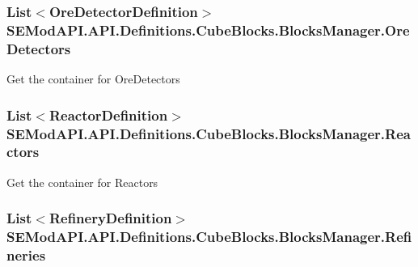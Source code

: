 \subsubsection[{Ore\+Detectors}]{\setlength{\rightskip}{0pt plus 5cm}List$<${\bf Ore\+Detector\+Definition}$>$ S\+E\+Mod\+A\+P\+I.\+A\+P\+I.\+Definitions.\+Cube\+Blocks.\+Blocks\+Manager.\+Ore\+Detectors\hspace{0.3cm}{\ttfamily [get]}}\label{class_s_e_mod_a_p_i_1_1_a_p_i_1_1_definitions_1_1_cube_blocks_1_1_blocks_manager_a89671e3572328f46c8fbfe5e205a9680}


Get the container for Ore\+Detectors 

\hypertarget{class_s_e_mod_a_p_i_1_1_a_p_i_1_1_definitions_1_1_cube_blocks_1_1_blocks_manager_ac682f8c246653d92109ff8ea4dc8aca7}{}
\subsubsection[{Reactors}]{\setlength{\rightskip}{0pt plus 5cm}List$<${\bf Reactor\+Definition}$>$ S\+E\+Mod\+A\+P\+I.\+A\+P\+I.\+Definitions.\+Cube\+Blocks.\+Blocks\+Manager.\+Reactors\hspace{0.3cm}{\ttfamily [get]}}\label{class_s_e_mod_a_p_i_1_1_a_p_i_1_1_definitions_1_1_cube_blocks_1_1_blocks_manager_ac682f8c246653d92109ff8ea4dc8aca7}


Get the container for Reactors 

\hypertarget{class_s_e_mod_a_p_i_1_1_a_p_i_1_1_definitions_1_1_cube_blocks_1_1_blocks_manager_a98e2664f605cd6482877d843f7cda5eb}{}
\subsubsection[{Refineries}]{\setlength{\rightskip}{0pt plus 5cm}List$<${\bf Refinery\+Definition}$>$ S\+E\+Mod\+A\+P\+I.\+A\+P\+I.\+Definitions.\+Cube\+Blocks.\+Blocks\+Manager.\+Refineries\hspace{0.3cm}{\ttfamily [get]}}\label{class_s_e_mod_a_p_i_1_1_a_p_i_1_1_definitions_1_1_cube_blocks_1_1_blocks_manager_a98e2664f605cd6482877d843f7cda5eb}


